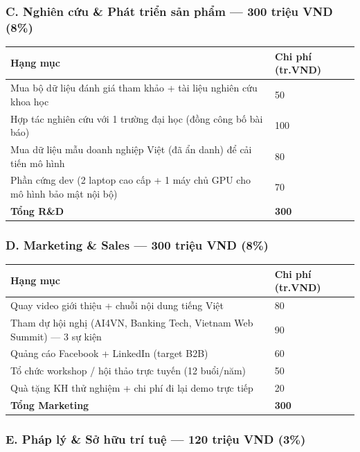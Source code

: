 \documentclass[11pt,a4paper]{article}
\begin{document}
\subsubsection{C. Nghiên cứu \& Phát triển sản phẩm --- 300 triệu VND (8\%)}

\begin{longtable}{|L{10cm}|R{2.2cm}|}
\hline
{}\textbf{Hạng mục} & \textbf{Chi phí (tr.VND)} \\
\hline\endhead

Mua bộ dữ liệu đánh giá tham khảo + tài liệu nghiên cứu khoa học & 50 \\ \hline
Hợp tác nghiên cứu với 1 trường đại học (đồng công bố bài báo) & 100 \\ \hline
Mua dữ liệu mẫu doanh nghiệp Việt (đã ẩn danh) để cải tiến mô hình & 80 \\ \hline
Phần cứng dev (2 laptop cao cấp + 1 máy chủ GPU cho mô hình bảo mật nội bộ) & 70 \\ \hline
\textbf{Tổng R\&D} & \textbf{300} \\ \hline

\end{longtable}

\subsubsection{D. Marketing \& Sales --- 300 triệu VND (8\%)}

\begin{longtable}{|L{10cm}|R{2.2cm}|}
\hline
{}\textbf{Hạng mục} & \textbf{Chi phí (tr.VND)} \\
\hline\endhead

Quay video giới thiệu + chuỗi nội dung tiếng Việt & 80 \\ \hline
Tham dự hội nghị (AI4VN, Banking Tech, Vietnam Web Summit) --- 3 sự kiện & 90 \\ \hline
Quảng cáo Facebook + LinkedIn (target B2B) & 60 \\ \hline
Tổ chức workshop / hội thảo trực tuyến (12 buổi/năm) & 50 \\ \hline
Quà tặng KH thử nghiệm + chi phí đi lại demo trực tiếp & 20 \\ \hline
\textbf{Tổng Marketing} & \textbf{300} \\ \hline

\end{longtable}

\subsubsection{E. Pháp lý \& Sở hữu trí tuệ --- 120 triệu VND (3\%)}
\end{document}
